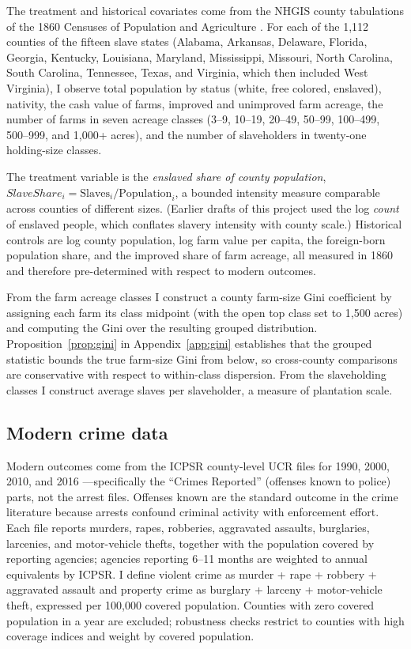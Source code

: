 \documentclass[12pt]{article}
\begin{document}
The treatment and historical covariates come from the NHGIS county tabulations of the 1860 Censuses of Population and Agriculture \citep{nhgis}. For each of the 1,112 counties of the fifteen slave states (Alabama, Arkansas, Delaware, Florida, Georgia, Kentucky, Louisiana, Maryland, Mississippi, Missouri, North Carolina, South Carolina, Tennessee, Texas, and Virginia, which then included West Virginia), I observe total population by status (white, free colored, enslaved), nativity, the cash value of farms, improved and unimproved farm acreage, the number of farms in seven acreage classes (3--9, 10--19, 20--49, 50--99, 100--499, 500--999, and 1{,}000+ acres), and the number of slaveholders in twenty-one holding-size classes.

The treatment variable is the \emph{enslaved share of county population},
$SlaveShare_i = \text{Slaves}_i / \text{Population}_i$,
a bounded intensity measure comparable across counties of different sizes. (Earlier drafts of this project used the log \emph{count} of enslaved people, which conflates slavery intensity with county scale.) Historical controls are log county population, log farm value per capita, the foreign-born population share, and the improved share of farm acreage, all measured in 1860 and therefore pre-determined with respect to modern outcomes.

From the farm acreage classes I construct a county farm-size Gini coefficient by assigning each farm its class midpoint (with the open top class set to 1{,}500 acres) and computing the Gini over the resulting grouped distribution. Proposition~\ref{prop:gini} in Appendix~\ref{app:gini} establishes that the grouped statistic bounds the true farm-size Gini from below, so cross-county comparisons are conservative with respect to within-class dispersion. From the slaveholding classes I construct average slaves per slaveholder, a measure of plantation scale.

\subsection{Modern crime data}

Modern outcomes come from the ICPSR county-level UCR files for 1990, 2000, 2010, and 2016 \citep{ucr2010}---specifically the ``Crimes Reported'' (offenses known to police) parts, not the arrest files. Offenses known are the standard outcome in the crime literature because arrests confound criminal activity with enforcement effort. Each file reports murders, rapes, robberies, aggravated assaults, burglaries, larcenies, and motor-vehicle thefts, together with the population covered by reporting agencies; agencies reporting 6--11 months are weighted to annual equivalents by ICPSR. I define violent crime as murder + rape + robbery + aggravated assault and property crime as burglary + larceny + motor-vehicle theft, expressed per 100,000 covered population. Counties with zero covered population in a year are excluded; robustness checks restrict to counties with high coverage indices and weight by covered population.
\end{document}
